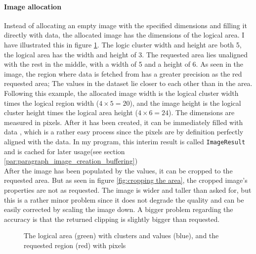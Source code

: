 \documentclass[10pt,a4paper,titlepage]{article}
\begin{document}
	\paragraph{Image allocation}
	Instead of allocating an empty image with the specified dimensions and filling it directly with data, the allocated image has the dimensions of the logical area. I have illustrated this in figure \ref{fig:logic_region_and_requested_area}. The logic cluster width and height are both 5, the logical area has the width and height of 3. The requested area lies unaligned with the rest in the middle, with a width of 5 and a height of 6. As seen in the image, the region where data is fetched from has a greater precision as the red requested area; The values in the dataset lie closer to each other than in the area.\\
	Following this example, the allocated image width is the logical cluster width times the logical region width (\(4 \times 5 = 20\)), and the image height is the logical cluster height times the logical area height (\(4 \times 6 = 24\)). The dimensions are measured in pixels. After it has been created, it can be immediately filled with data , which is a rather easy process since the pixels are by definition perfectly aligned with the data. In my program, this interim result is called \verb|ImageResult| and is cached for later usage(see section \ref{par:paragraph_image_creation_buffering}) \\
	After the image has been populated by the values, it can be cropped to the requested area. But as seen in figure \ref{fig:cropping the area}, the cropped image's properties are not as requested. The image is wider and taller than asked for, but this is a rather minor problem since it does not degrade the quality and can be easily corrected by scaling the image down. A bigger problem regarding the accuracy is that the returned clipping is slightly bigger than requested.
	
	\begin{figure}
		\centering
		\caption{The logical area (green) with clusters and values (blue), and the requested region (red) with pixels}
		\label{fig:logic_region_and_requested_area}
	\end{figure}
	
\end{document}
